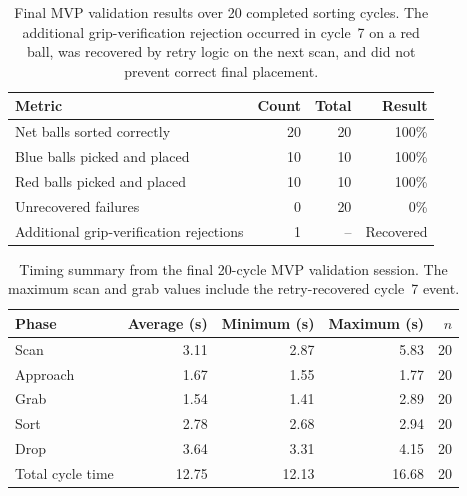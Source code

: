 
\begin{table}[H]
    \centering
    \renewcommand{\arraystretch}{1.3}
    \begin{tabular}{|l|r|r|r|}
        \hline
        \textbf{Metric} & \textbf{Count} &
        \textbf{Total} & \textbf{Result} \\
        \hline
        Net balls sorted correctly & 20 & 20 & 100\% \\
        \hline
        Blue balls picked and placed & 10 & 10 & 100\% \\
        \hline
        Red balls picked and placed & 10 & 10 & 100\% \\
        \hline
        Unrecovered failures & 0 & 20 & 0\% \\
        \hline
        Additional grip-verification rejections & 1 & -- & Recovered \\
        \hline
    \end{tabular}
    \caption{Final MVP validation results over 20 completed
    sorting cycles. The additional grip-verification rejection
    occurred in cycle~7 on a red ball, was recovered by retry
    logic on the next scan, and did not prevent correct final
    placement.}
    \label{tab:mvp-final-results}
\end{table}


\begin{table}[H]
    \centering
    \renewcommand{\arraystretch}{1.3}
    \begin{tabular}{|l|r|r|r|r|}
        \hline
        \textbf{Phase} & \textbf{Average (s)} &
        \textbf{Minimum (s)} & \textbf{Maximum (s)} &
        \textbf{$n$} \\
        \hline
        Scan & 3.11 & 2.87 & 5.83 & 20 \\
        \hline
        Approach & 1.67 & 1.55 & 1.77 & 20 \\
        \hline
        Grab & 1.54 & 1.41 & 2.89 & 20 \\
        \hline
        Sort & 2.78 & 2.68 & 2.94 & 20 \\
        \hline
        Drop & 3.64 & 3.31 & 4.15 & 20 \\
        \hline
        Total cycle time & 12.75 & 12.13 & 16.68 & 20 \\
        \hline
    \end{tabular}
    \caption{Timing summary from the final 20-cycle MVP
    validation session. The maximum scan and grab values include
    the retry-recovered cycle~7 event.}
    \label{tab:mvp-final-timing}
\end{table}

